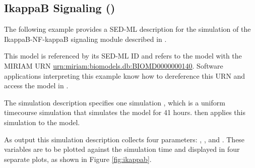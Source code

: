 

\subsection{IkappaB Signaling ()}
The following example provides a SED-ML description for the simulation of the IkappaB-NF-kappaB signaling module described in \citep{hoffmann2002ikappab}.

This model is referenced by its SED-ML ID  and refers to the model with the MIRIAM URN \url{urn:miriam:biomodels.db:BIOMD0000000140}. 
Software applications interpreting this example know how to dereference this URN and access the model in \biom \citep{N+06}.

The simulation description specifies one simulation , which is a uniform timecourse simulation that simulates the model for 41 hours.  then applies this simulation to the model.

As output this simulation description collects four parameters: , ,  and . These variables are to be plotted against the simulation time and displayed in four separate plots, as shown in Figure \ref{fig:ikappab}.

